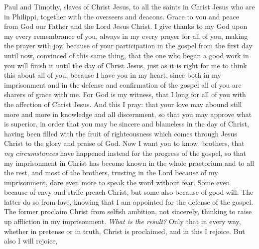 
\begin{biblechapter} %
 Paul and Timothy, slaves of Christ Jesus, to all the saints in Christ Jesus who are in Philippi, together with the overseers and deacons.
\verse Grace to you and peace from God our Father and the Lord Jesus Christ.
 I give thanks to my God upon my every remembrance of you,
\verse always in my every prayer for all of you, making the prayer with joy,
\verse because of your participation in the gospel from the first day until now,
\verse convinced of this same thing, that the one who began a good work in you will finish it until the day of Christ Jesus,
\verse just as it is right for me to think this about all of you, because I have you in my heart, since both in my imprisonment and in the defense and confirmation of the gospel all of you are sharers of grace with me.
\verse For God is my witness, that I long for all of you with the affection of Christ Jesus.
 And this I pray: that your love may abound still more and more in knowledge and all discernment,
\verse so that you may approve what is superior, in order that you may be sincere and blameless in the day of Christ,
\verse having been filled with the fruit of righteousness which comes through Jesus Christ to the glory and praise of God.
 Now I want you to know, brothers, that \textit{my circumstances} have happened instead for the progress of the gospel,
\verse so that my imprisonment in Christ has become known in the whole praetorium and to all the rest,
\verse and most of the brothers, trusting in the Lord because of my imprisonment, dare even more to speak the word without fear.
\verse Some even because of envy and strife preach Christ, but some also because of good will.
\verse The latter do so from love, knowing that I am appointed for the defense of the gospel.
\verse The former proclaim Christ from selfish ambition, not sincerely, thinking to raise up affliction in my imprisonment.
\verse \textit{What is the result?} Only that in every way, whether in pretense or in truth, Christ is proclaimed, and in this I rejoice. But also I will rejoice,

\end{biblechapter}
